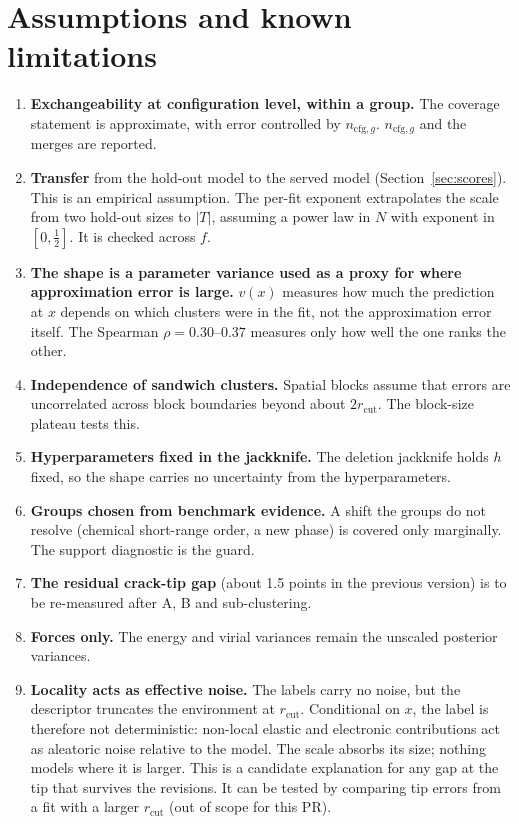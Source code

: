 \documentclass[11pt,a4paper]{article}
\newcommand{\ncfg}{n_{\mathrm{cfg},g}}
\begin{document}
\section{Assumptions and known limitations}\label{sec:limits}

\begin{enumerate}
\item \textbf{Exchangeability at configuration level, within a group.} The coverage statement is
approximate, with error controlled by $\ncfg$. $\ncfg$ and the merges are reported.
\item \textbf{Transfer} from the hold-out model to the served model (Section~\ref{sec:scores}). This is an
empirical assumption. The per-fit exponent extrapolates the scale from two hold-out sizes to $|T|$,
assuming a power law in $N$ with exponent in $[0,\tfrac12]$. It is checked across $f$.
\item \textbf{The shape is a parameter variance used as a proxy for where approximation error is large.}
$v(x)$ measures how much the prediction at $x$ depends on which clusters were in the fit, not the
approximation error itself. The Spearman $\rho=0.30$--$0.37$ measures only how well the one ranks the
other.
\item \textbf{Independence of sandwich clusters.} Spatial blocks assume that errors are uncorrelated
across block boundaries beyond about $2r_{\mathrm{cut}}$. The block-size plateau tests this.
\item \textbf{Hyperparameters fixed in the jackknife.} The deletion jackknife holds $h$ fixed, so the
shape carries no uncertainty from the hyperparameters.
\item \textbf{Groups chosen from benchmark evidence.} A shift the groups do not resolve (chemical
short-range order, a new phase) is covered only marginally. The support diagnostic is the guard.
\item \textbf{The residual crack-tip gap} (about 1.5 points in the previous version) is to be
re-measured after A, B and sub-clustering.
\item \textbf{Forces only.} The energy and virial variances remain the unscaled posterior variances.
\item \textbf{Locality acts as effective noise.} The labels carry no noise, but the descriptor
truncates the environment at $r_{\mathrm{cut}}$. Conditional on $x$, the label is therefore not
deterministic: non-local elastic and electronic contributions act as aleatoric noise relative to the
model. The scale absorbs its size; nothing models where it is larger. This is a candidate explanation
for any gap at the tip that survives the revisions. It can be tested by comparing tip errors from a fit
with a larger $r_{\mathrm{cut}}$ (out of scope for this PR).
\end{enumerate}
\end{document}
